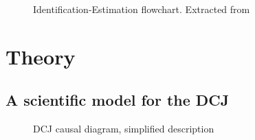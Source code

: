 \documentclass[
  authoryear,
  preprint,
  1p]{elsarticle}
\begin{document}
\begin{figure}


\caption{\label{fig-IEflow}Identification-Estimation flowchart.
Extracted from \citet[32]{Neal_2020}}

\end{figure}%

\section{Theory}\label{sec-theory}

\subsection{A scientific model for the DCJ}\label{sec-theory-scientific}

\begin{figure}


\caption{\label{fig-SciModel_simp1}DCJ causal diagram, simplified
description}

\end{figure}%
\end{document}
